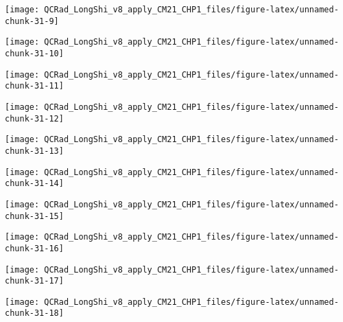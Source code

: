 \documentclass[
  10pt,
  a4paper,oneside]{article}
\begin{document}
\begin{center}\texttt{[image: QCRad\_LongShi\_v8\_apply\_CM21\_CHP1\_files/figure-latex/unnamed-chunk-31-9]} \end{center}

\begin{center}\texttt{[image: QCRad\_LongShi\_v8\_apply\_CM21\_CHP1\_files/figure-latex/unnamed-chunk-31-10]} \end{center}

\begin{center}\texttt{[image: QCRad\_LongShi\_v8\_apply\_CM21\_CHP1\_files/figure-latex/unnamed-chunk-31-11]} \end{center}

\begin{center}\texttt{[image: QCRad\_LongShi\_v8\_apply\_CM21\_CHP1\_files/figure-latex/unnamed-chunk-31-12]} \end{center}

\begin{center}\texttt{[image: QCRad\_LongShi\_v8\_apply\_CM21\_CHP1\_files/figure-latex/unnamed-chunk-31-13]} \end{center}

\begin{center}\texttt{[image: QCRad\_LongShi\_v8\_apply\_CM21\_CHP1\_files/figure-latex/unnamed-chunk-31-14]} \end{center}

\begin{center}\texttt{[image: QCRad\_LongShi\_v8\_apply\_CM21\_CHP1\_files/figure-latex/unnamed-chunk-31-15]} \end{center}

\begin{center}\texttt{[image: QCRad\_LongShi\_v8\_apply\_CM21\_CHP1\_files/figure-latex/unnamed-chunk-31-16]} \end{center}

\begin{center}\texttt{[image: QCRad\_LongShi\_v8\_apply\_CM21\_CHP1\_files/figure-latex/unnamed-chunk-31-17]} \end{center}

\begin{center}\texttt{[image: QCRad\_LongShi\_v8\_apply\_CM21\_CHP1\_files/figure-latex/unnamed-chunk-31-18]} \end{center}
\end{document}

